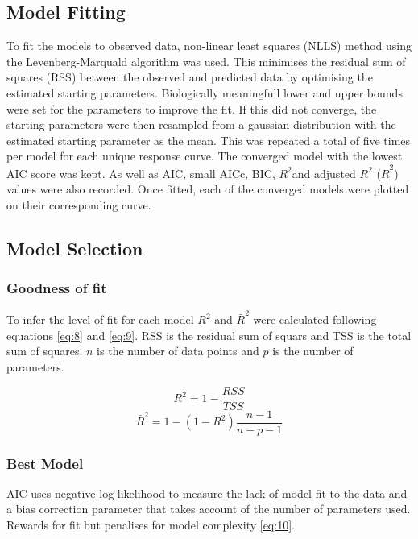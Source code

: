 \documentclass[11pt]{article}
\begin{document}
	\subsection{Model Fitting}
	To fit the models to observed data, non-linear least squares (NLLS) method using the Levenberg-Marquald algorithm was used. This minimises the residual sum of squares (RSS) between the observed and predicted data by optimising the estimated starting parameters. Biologically meaningfull lower and upper bounds were set for the parameters to improve the fit. If this did not converge, the starting parameters were then resampled from a gaussian distribution with the estimated starting parameter as the mean. This was repeated a total of five times per model for each unique response curve. The converged model with the lowest AIC score was kept. As well as AIC, small AICc, BIC, \(R^{2}\)and adjusted \(R^{2}\) (\(\bar R^{2}\)) values were also recorded. Once fitted, each of the converged models were plotted on their corresponding curve.
	
	\subsection{Model Selection}
	\subsubsection{Goodness of fit}
	To infer the level of fit for each model \(R^{2}\) and \(\bar R^{2}\) were calculated following equations \eqref{eq:8} and \eqref{eq:9}. RSS is the residual sum of squars and TSS is the total sum of squares. \(n\) is the number of data points and \(p\) is the number of parameters.
	
		\begin{multicols}{2}
		\begin{equation}
		R^{2} = 1 - \frac{RSS}{TSS} \label{eq:8}
		\end{equation} 
		\begin{equation}
		\bar R^{2} = 1 - (1 - R^{2})\frac{n - 1}{n - p - 1} \label{eq:9}
		\end{equation}
	\end{multicols}
	
	\subsubsection{Best Model}
	AIC uses negative log-likelihood to measure the lack of model fit to the data and a bias correction parameter that takes account of the number of parameters used. Rewards for fit but penalises for model complexity \eqref{eq:10}.
	
\end{document}
